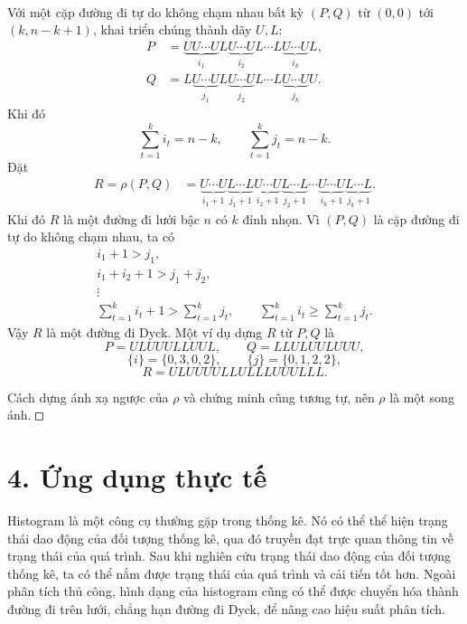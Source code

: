 \documentclass[11pt]{article}
\newcommand{\square}{\mathord{\vcenter{\hrule height .5pt
  \hbox{\vrule width .5pt height 5pt\kern5pt\vrule width .5pt}
  \hrule height .5pt}}}
\begin{document}
\paragraph{}
Với một cặp đường đi tự do không chạm nhau bất kỳ \((P,Q)\) từ \((0,0)\) tới
\((k,n-k+1)\), khai triển chúng thành dãy \(U,L\):
\[
\begin{aligned}
  P&=
  \underbrace{UU\cdots U}_{i_1}
  L\underbrace{U\cdots U}_{i_2}
  L\cdots L
  \underbrace{U\cdots U}_{i_k}L,\\
  Q&=
  L\underbrace{U\cdots U}_{j_1}
  L\underbrace{U\cdots U}_{j_2}
  L\cdots L
  \underbrace{U\cdots U}_{j_k}U.
\end{aligned}
\]
Khi đó
\[
  \sum_{t=1}^{k}i_t=n-k,\qquad
  \sum_{t=1}^{k}j_t=n-k.
\]
Đặt
\[
\begin{aligned}
  R=\rho(P,Q)
  &=
  \underbrace{U\cdots U}_{i_1+1}
  \underbrace{L\cdots L}_{j_1+1}
  \underbrace{U\cdots U}_{i_2+1}
  \underbrace{L\cdots L}_{j_2+1}
  \cdots
  \underbrace{U\cdots U}_{i_k+1}
  \underbrace{L\cdots L}_{j_k+1}.
\end{aligned}
\]
Khi đó \(R\) là một đường đi lưới bậc \(n\) có \(k\) đỉnh nhọn. Vì \((P,Q)\)
là cặp đường đi tự do không chạm nhau, ta có
\[
\begin{gathered}
  i_1+1>j_1,\\
  i_1+i_2+1>j_1+j_2,\\
  \vdots\\
  \sum_{t=1}^{k}i_t+1>\sum_{t=1}^{k}j_t,\qquad
  \sum_{t=1}^{k}i_t\ge\sum_{t=1}^{k}j_t.
\end{gathered}
\]
Vậy \(R\) là một đường đi Dyck. Một ví dụ dựng \(R\) từ \(P,Q\) là
\[
  P=ULUUULLUUL,\qquad Q=LLULUULUUU,
\]
\[
  \{i\}=\{0,3,0,2\},\qquad
  \{j\}=\{0,1,2,2\},
\]
\[
  R=ULUUUULLULLLUUULLL.
\]

Cách dựng ánh xạ ngược của \(\rho\) và chứng minh cũng tương tự, nên
\(\rho\) là một song ánh. \(\square\)

\section*{4. Ứng dụng thực tế}

Histogram là một công cụ thường gặp trong thống kê. Nó có thể thể hiện trạng
thái dao động của đối tượng thống kê, qua đó truyền đạt trực quan thông tin về
trạng thái của quá trình. Sau khi nghiên cứu trạng thái dao động của đối tượng
thống kê, ta có thể nắm được trạng thái của quá trình và cải tiến tốt hơn.
Ngoài phân tích thủ công, hình dạng của histogram cũng có thể được chuyển hóa
thành đường đi trên lưới, chẳng hạn đường đi Dyck, để nâng cao hiệu suất phân
tích.
\end{document}

